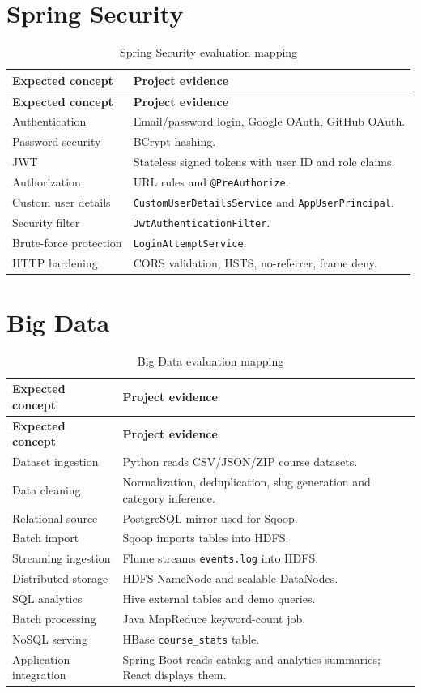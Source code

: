 \documentclass[12pt,a4paper]{report}
\begin{document}
\section{Spring Security}
\begin{longtable}{p{}p{}}
\caption{Spring Security evaluation mapping}\\
\toprule
\textbf{Expected concept} & \textbf{Project evidence}\\
\midrule
\endfirsthead
\toprule
\textbf{Expected concept} & \textbf{Project evidence}\\
\midrule
\endhead
Authentication & Email/password login, Google OAuth, GitHub OAuth.\\
Password security & BCrypt hashing.\\
JWT & Stateless signed tokens with user ID and role claims.\\
Authorization & URL rules and \texttt{@PreAuthorize}.\\
Custom user details & \texttt{CustomUserDetailsService} and \texttt{AppUserPrincipal}.\\
Security filter & \texttt{JwtAuthenticationFilter}.\\
Brute-force protection & \texttt{LoginAttemptService}.\\
HTTP hardening & CORS validation, HSTS, no-referrer, frame deny.\\
\bottomrule
\end{longtable}

\section{Big Data}
\begin{longtable}{p{}p{}}
\caption{Big Data evaluation mapping}\\
\toprule
\textbf{Expected concept} & \textbf{Project evidence}\\
\midrule
\endfirsthead
\toprule
\textbf{Expected concept} & \textbf{Project evidence}\\
\midrule
\endhead
Dataset ingestion & Python reads CSV/JSON/ZIP course datasets.\\
Data cleaning & Normalization, deduplication, slug generation and category inference.\\
Relational source & PostgreSQL mirror used for Sqoop.\\
Batch import & Sqoop imports tables into HDFS.\\
Streaming ingestion & Flume streams \texttt{events.log} into HDFS.\\
Distributed storage & HDFS NameNode and scalable DataNodes.\\
SQL analytics & Hive external tables and demo queries.\\
Batch processing & Java MapReduce keyword-count job.\\
NoSQL serving & HBase \texttt{course\_stats} table.\\
Application integration & Spring Boot reads catalog and analytics summaries; React displays them.\\
\bottomrule
\end{longtable}
\end{document}
